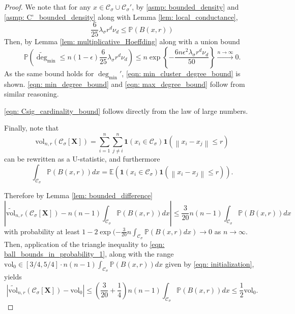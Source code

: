 \documentclass{article}
\newcommand{\set}[1]{\left\{#1\right\}}
\newcommand{\vol}{\mathrm{vol}}
\newcommand{\abs}[1]{\left \lvert #1 \right \rvert}
\newcommand{\norm}[1]{\left\lVert#1\right\rVert}
\newcommand{\1}{\mathbf{1}}
\newcommand{\degminpr}{\deg_{\min}'}
\newcommand{\degminwt}{\widetilde{\deg}_{\min}}
\newcommand{\Xbf}{\mathbf{X}}
\newcommand{\Pbb}{\mathbb{P}}
\newcommand{\Ebb}{\mathbb{E}}
\newcommand{\Cset}{\mathcal{C}}
\newcommand{\Csig}{\Cset_{\sigma}}
\theoremstyle{aldenthm}
\begin{document}
\begin{proof}
	We note that for any $x \in \Csig \cup \Csig'$, by \ref{asmp: bounded_density} and \ref{asmp: C'_bounded_density} along with Lemma \ref{lem: local_conductance},
	\begin{equation*}
	\frac{6}{25} \lambda_{\sigma} r^d \nu_d \leq \Pbb(B(x,r))
	\end{equation*}
	Then, by Lemma \ref{lem: multiplicative_Hoeffding} along with a union bound
	\begin{equation*}
	\Pbb \left(\degminwt \leq n (1 - \epsilon) \frac{6}{25}  \lambda_{\sigma} r^d \nu_d \right) \leq n \exp\set{- \frac{6 n \epsilon^2  \lambda_{\sigma} r^d \nu_d}{50} } \overset{n \to \infty}{\longrightarrow} 0.
	\end{equation*}
	As the same bound holds for $\degminpr$, \eqref{eqn: min_cluster_degree_bound} is shown. \eqref{eqn: min_degree_bound} and \eqref{eqn: max_degree_bound} follow from similar reasoning.
	
	\eqref{eqn: Csig_cardinality_bound} follows directly from the law of large numbers.
	
	Finally, note that
	\begin{equation*}
	\vol_{n,r}(\Csig[\Xbf]) = \sum_{i = 1}^{n} \sum_{j \neq i}^{n} \1(x_i \in \Csig) \1(\norm{x_i - x_j} \leq r)
	\end{equation*}
	can be rewritten as a U-statistic, and furthermore
	\begin{equation*}
	\int_{\Csig} \Pbb(B(x,r)) dx = \Ebb\left(\1(x_i \in \Csig) \1(\norm{x_i - x_j} \leq r)\right).
	\end{equation*}
	
	Therefore by Lemma \ref{lem: bounded_difference}
	\begin{equation}
	\label{eqn: ball_bounds_in_probability_1}
	\abs{\widetilde{\vol}_{n,r}(\Csig[\Xbf]) - n(n-1)\int_{\Csig} \Pbb(B(x,r)) dx }\leq \frac{3}{20}n(n-1)\int_{\Csig} \Pbb(B(x,r)) dx 
	\end{equation}
	with probability at least $1 - 2\exp(-\frac{3}{20}n \int_{\Csig} \Pbb(B(x,r) dx) \to 0$ as $n \to \infty$. Then, application of the triangle inequality to \eqref{eqn: ball_bounds_in_probability_1}, along with the range $\vol_0 \in [3/4,5/4] \cdot n(n-1)\int_{\Csig} \Pbb(B(x,r)) dx$ given by \eqref{eqn: initialization}, yields
	\begin{equation*}
	\abs{\widetilde{\vol}_{n,r}(\Csig[\Xbf]) - \vol_0} \leq \left(\frac{3}{20} + \frac{1}{4}\right) n(n-1)\int_{\Csig} \Pbb(B(x,r)) dx \leq \frac{1}{2} \vol_0.
	\end{equation*}
\end{proof}
\end{document}
